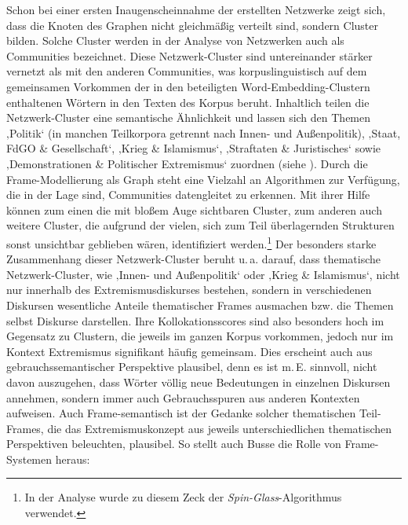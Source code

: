 Schon bei einer ersten Inaugenscheinnahme der erstellten Netzwerke zeigt sich, dass die Knoten des Graphen nicht gleichmäßig verteilt sind, sondern Cluster bilden. Solche Cluster werden in der Analyse von Netzwerken auch als Communities bezeichnet. Diese Netzwerk-Cluster sind untereinander stärker vernetzt als mit den anderen Communities, was korpuslinguistisch auf dem gemeinsamen Vorkommen der in den beteiligten Word-Embedding-Clustern enthaltenen Wörtern in den Texten des Korpus beruht. Inhaltlich teilen die Netzwerk-Cluster eine semantische Ähnlichkeit und lassen sich den Themen ‚Politik` (in manchen Teilkorpora getrennt nach Innen- und Außenpolitik), ‚Staat, FdGO \& Gesellschaft`, ‚Krieg \& Islamismus`, ‚Straftaten \& Juristisches` sowie ‚Demonstrationen \& Politischer Extremismus` zuordnen (siehe ). Durch die Frame-Modellierung als Graph steht eine Vielzahl an Algorithmen zur Verfügung, die in der Lage sind, Communities datengleitet zu erkennen. Mit ihrer Hilfe können zum einen die mit bloßem Auge sichtbaren Cluster, zum anderen auch weitere Cluster, die aufgrund der vielen, sich zum Teil überlagernden Strukturen sonst unsichtbar geblieben wären, identifiziert werden.\footnote{In der Analyse wurde zu diesem Zeck der \emph{Spin-Glass}-Algorithmus \autocite{reichardtStatisticalMechanicsCommunity2006} verwendet.} Der besonders starke Zusammenhang dieser Netzwerk-Cluster beruht u.\,a. darauf, dass thematische Netzwerk-Cluster, wie ‚Innen- und Außenpolitik` oder ‚Krieg \& Islamismus`, nicht nur innerhalb des Extremismusdiskurses bestehen, sondern in verschiedenen Diskursen wesentliche Anteile thematischer Frames ausmachen bzw. die Themen selbst Diskurse darstellen. Ihre Kollokationsscores sind also besonders hoch im Gegensatz zu Clustern, die jeweils im ganzen Korpus vorkommen, jedoch nur im Kontext Extremismus signifikant häufig gemeinsam. Dies erscheint auch aus gebrauchssemantischer Perspektive plausibel, denn es ist m.\,E. sinnvoll, nicht davon auszugehen, dass Wörter völlig neue Bedeutungen in einzelnen Diskursen annehmen, sondern immer auch Gebrauchsspuren aus anderen Kontexten aufweisen. Auch Frame-semantisch ist der Gedanke solcher thematischen Teil-Frames, die das Extremismuskonzept aus jeweils unterschiedlichen thematischen Perspektiven beleuchten, plausibel. So stellt auch Busse die Rolle von Frame-Systemen heraus:

